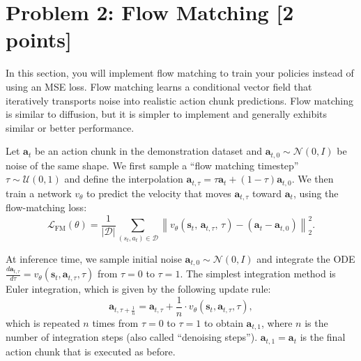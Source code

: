 \documentclass[12pt]{article}
\begin{document}
\newpage
\section*{Problem 2: Flow Matching [2 points]}

In this section, you will implement flow matching to train your policies instead of using an MSE loss.
Flow matching learns a conditional vector field that iteratively transports noise into realistic action chunk predictions.
Flow matching is similar to diffusion, but it is simpler to implement and generally exhibits similar or better performance.

Let $\mathbf{a}_t$ be an action chunk in the demonstration dataset and $\mathbf{a}_{t,0} \sim \mathcal{N}(0, I)$ be noise of the same shape.
We first sample a ``flow matching timestep'' $\tau \sim \mathcal{U}(0, 1)$ and define the interpolation
$\mathbf{a}_{t,\tau} = \tau\mathbf{a}_t + (1 - \tau)\mathbf{a}_{t,0}$.
We then train a network $v_\theta$ to predict the velocity that moves $\mathbf{a}_{t,\tau}$ toward $\mathbf{a}_t$, using the flow-matching loss:
\begin{equation}
    \mathcal{L}_{\mathrm{FM}}(\theta) = \frac{1}{|\mathcal{D}|}\sum_{(s_t, a_t) \in \mathcal{D}} \left\| v_\theta(\mathbf{s}_t,\, \mathbf{a}_{t,\tau},\, \tau) - \left(\mathbf{a}_t - \mathbf{a}_{t,0}\right) \right\|_2^2.
\end{equation}

At inference time, we sample initial noise $\mathbf{a}_{t,0} \sim \mathcal{N}(0, I)$ and integrate the ODE $\frac{d\mathbf{a}_{t,\tau}}{d\tau} = v_\theta(\mathbf{s}_t, \mathbf{a}_{t,\tau}, \tau)$ from $\tau = 0$ to $\tau = 1$.
The simplest integration method is Euler integration, which is given by the following update rule:
\begin{equation}
    \mathbf{a}_{t,\tau+\frac{1}{n}} = \mathbf{a}_{t,\tau} + \frac{1}{n} \cdot v_\theta(\mathbf{s}_t, \mathbf{a}_{t,\tau}, \tau),
\end{equation}
which is repeated $n$ times from $\tau = 0$ to $\tau = 1$ to obtain $\mathbf{a}_{t,1}$, where $n$ is the number of integration steps (also called ``denoising steps''). $\mathbf{a}_{t,1} = \mathbf{a}_t$ is the final action chunk that is executed as before.
\end{document}

